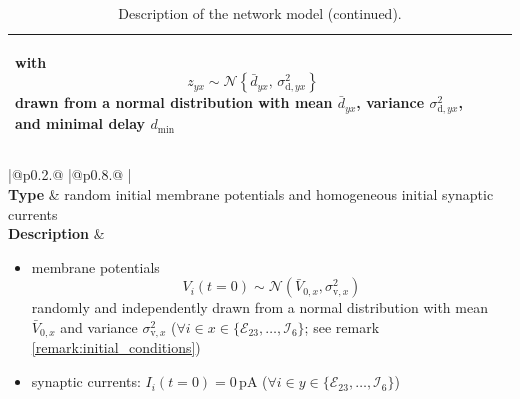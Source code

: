 \documentclass[10pt,a4paper,twoside,american]{article}
\theoremstyle{definitionstyle}
\begin{document}
\begin{table}[H]
\begin{tabular}{
  |@{\hspace*{\marg}}p{}@{\hspace*{\marg}}
  |@{\hspace*{\marg}}p{}@{\hspace*{\marg}}
  |}
\begin{itemize}
\begin{equation}
  \end{equation}
  with
  \begin{equation}
      z_{yx} \sim\mathcal{N}\left\{\bar{d}_{yx},\,\sigma_{\text{d},yx}^2\right\}
  \end{equation}
  drawn from a normal distribution with mean $\bar{d}_{yx}$, variance $\sigma_{\text{d},yx}^2$, and minimal delay $d_\text{min}$
  \end{itemize}\\
  \hline
\end{tabular}
\begin{tabular}{
  |@{\hspace*{\marg}}p{}@{\hspace*{\marg}}
  |@{\hspace*{\marg}}p{}@{\hspace*{\marg}}
  |}
  \hline
  \\
\hline
\textbf{Type} & random initial membrane potentials and homogeneous initial synaptic currents\\
\hline
  \textbf{Description} &
  \begin{itemize}
  \item membrane potentials
    \begin{equation}
      V_i(t=0)\sim\mathcal{N}(\bar{V}_{0,x},\sigma_{\text{v},x}^2)
    \end{equation}
  randomly and independently drawn from a normal distribution with mean $\bar{V}_{0,x}$ and variance $\sigma^2_{\text{v},x}$ ($\forall i \in x\in\{\mathcal{E}_{23},\ldots,\mathcal{I}_{6}\}$; see remark \ref{remark:initial_conditions})
  \item synaptic currents: $I_{i}(t=0)=0\,\text{pA}$ ($\forall i \in y\in\{\mathcal{E}_{23},\ldots,\mathcal{I}_{6}\}$)
  \end{itemize}\\
  \hline
\end{tabular}
\caption{Description of the network model (continued).}
\end{table}
\clearpage
\end{document}
